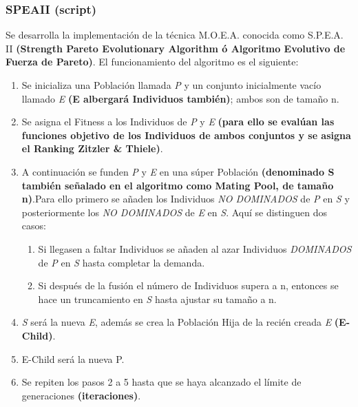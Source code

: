 \documentclass[class=report, crop=false]{standalone}
\begin{document}
\subsubsection{SPEAII (script)}
\label{sec:a_2_6_2}
Se desarrolla la implementación de la técnica M.O.E.A. 
conocida como S.P.E.A. II \textbf{(Strength Pareto Evolutionary Algorithm ó Algoritmo Evolutivo de Fuerza de Pareto)}.\break
El funcionamiento del algoritmo es el siguiente:

\begin{enumerate}
\item Se inicializa una Población llamada \emph{P} y un conjunto inicialmente vacío llamado \emph{E} \textbf{(E albergará Individuos también)}; ambos son de tamaño n.
\item Se asigna el Fitness a los Individuos de \emph{P} y \emph{E} \textbf{(para ello se evalúan las funciones objetivo de los Individuos de ambos conjuntos y se asigna el Ranking Zitzler \& Thiele)}.
\item A continuación se funden \emph{P} y \emph{E} en una súper Población \textbf{(denominado S también señalado en el algoritmo como Mating Pool, de tamaño n)}.Para ello primero se añaden los Individuos \emph{NO DOMINADOS} de \emph{P} en \emph{S} y posteriormente los \emph{NO DOMINADOS} de \emph{E} en \emph{S}.\break 
Aquí se distinguen dos casos:
      \begin{enumerate}
      \item Si llegasen a faltar Individuos se añaden al azar Individuos \emph{DOMINADOS} de \emph{P} en \emph{S} hasta completar la demanda.
      \item Si después de la fusión el número de Individuos supera a n, entonces se hace un truncamiento en \emph{S} hasta ajustar su tamaño a n.
      \end{enumerate}
\item \emph{S} será la nueva \emph{E}, además se crea la Población Hija de la recién creada \emph{E} \textbf{(E-Child)}.
\item E-Child será la nueva P.
\item Se repiten los pasos 2 a 5 hasta que se haya alcanzado el límite de generaciones \textbf{(iteraciones)}.
\end{enumerate}
\end{document}
